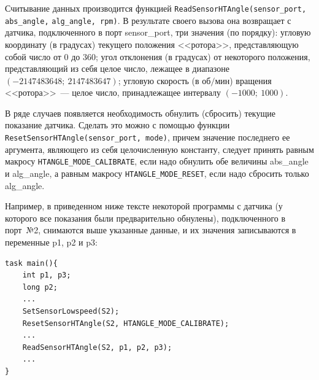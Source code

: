 Считывание данных производится функцией \verb|ReadSensorHTAngle(sensor_port, abs_angle,| \verb|alg_angle, rpm)|.
В результате своего вызова она возвращает с датчика, подключенного в порт sensor\_port, три значения (по порядку): угловую координату (в градусах) текущего положения <<ротора>>, представляющую собой число от $0$ до $360$; угол отклонения (в градусах) от некоторого положения, представляющий из себя целое число, лежащее в диапазоне $(-2147483648;\ 2147483647)$; угловую скорость (в $\text{об}/\text{мин}$) вращения <<ротора>>~--- целое число, принадлежащее интервалу $(-1000;\ 1000)$.

В ряде случаев появляется необходимость обнулить (сбросить) текущие показание датчика.
Сделать это можно с помощью функции \verb|ResetSensorHTАngle(sensor_port, mode)|, причем значение последнего ее аргумента, являющего из себя целочисленную константу, следует принять равным макросу \verb|HTANGLE_MODE_CALIBRATE|, если надо обнулить обе величины abs\_angle и alg\_angle, а равным макросу \verb|HTANGLE_MODE_RESET|, если надо сбросить только alg\_angle.

Например, в приведенном ниже тексте некоторой программы с датчика (у которого все показания были предварительно обнулены), подключенного в порт~№2, снимаются выше указанные данные, и их значения записываются в переменные p1, p2 и p3:
\begin{verbatim}
task main(){	
    int p1, p3;
    long p2;
    ...
    SetSensorLowspeed(S2);
    ResetSensorHTАngle(S2, HTANGLE_MODE_CALIBRATE);
    ...
    ReadSensorHTAngle(S2, p1, p2, p3);
    ...
}	
\end{verbatim}     
